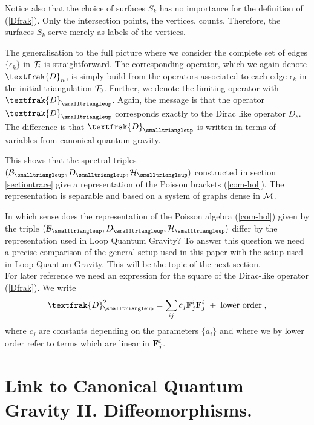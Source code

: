 \documentclass[12pt]{article}
\newcommand{\ba}{\begin{eqnarray}}
\newcommand{\ea}{\end{eqnarray}}
\def\e{\epsilon}
\def\cb{{\cal B}}
\def\ch{{\cal H}}
\def\cm{{\cal M}}
\def\ct{{\cal T}}
\begin{document}
Notice also that the choice of surfaces $S_k$ has no importance for the definition of (\ref{Dfrak}). Only the intersection points, the vertices, counts. Therefore, the surfaces $S_k$ serve merely as labels of the vertices.




The generalisation to the full picture where we consider the complete set of edges $\{\e_k\}$ in $\ct_i$ is straightforward. The corresponding operator, which we again denote $\textfrak{D}_n$, is simply build from the operators associated to each edge $\e_k$ in the initial triangulation $\ct_0$. Further, we denote the limiting operator with $\textfrak{D}_{\smalltriangleup}$. Again, the message is that the operator $\textfrak{D}_{\smalltriangleup}$ corresponds exactly to the Dirac like operator $D_{\smalltriangleup}$. The difference is that $\textfrak{D}_{\smalltriangleup}$ is written in terms of variables from canonical quantum gravity.




This shows that the spectral triples $(\cb_{\smalltriangleup},D_{\smalltriangleup},\ch_\smalltriangleup)$ constructed in section \ref{sectiontrace} give a representation of the Poisson brackets (\ref{com-hol}). The representation is separable and based on a system of graphs dense in $\cm$.



In which sense does the representation of the Poisson algebra (\ref{com-hol}) given by the triple $(\cb_{\smalltriangleup},D_{\smalltriangleup},\ch_\smalltriangleup)$ differ by the representation used in Loop Quantum Gravity? To answer this question we need a precise comparison of the general setup used in this paper with the setup used in Loop Quantum Gravity. This will be the topic of the next section.\\




For later reference we need an expression for the square of the Dirac-like operator (\ref{Dfrak}). We write
\ba 
\textfrak{D}^2_{\smalltriangleup} = \sum_{ij} c_{j} {\bf F}_j^i{\bf F}^i_j\; + \;\mbox{lower order} \;,
\label{SE1}
\ea
where $c_{j}$ are constants depending on the parameters $\{a_i\}$ and where we by lower order refer to terms which are linear in ${\bf F}^i_j$.






\section{Link to Canonical Quantum Gravity II. Diffeomorphisms.}
\label{section2}
\end{document}

